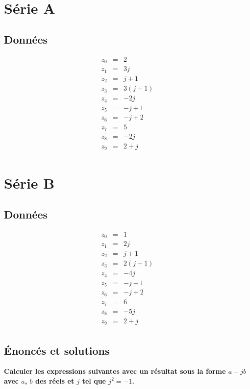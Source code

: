 \documentclass[11pt]{article}
\begin{document}
\begin{multicols}{2}

\section*{Série A}
    \subsection*{Données}
  \begin{eqnarray*}
    z_{0} & = & 2\\
    z_{1} & = & 3j\\
    z_{2} & = & j + 1\\
    z_{3} & = & 3(j+1)\\
    z_{4} & = & -2j\\
    z_{5} & = & -j + 1\\
    z_{6} & = & -j + 2\\
    z_{7} & = & 5\\
    z_{8} & = & -2j\\
    z_{9} & = & 2 + j\\
  \end{eqnarray*}

\section*{Série B}

  \subsection*{Données}

  \begin{eqnarray*}
    z_{0} & = & 1\\
    z_{1} & = & 2j\\
    z_{2} & = & j + 1\\
    z_{3} & = & 2(j+1)\\
    z_{4} & = & -4j\\
    z_{5} & = & -j - 1\\
    z_{6} & = & -j + 2\\
    z_{7} & = & 6\\
    z_{8} & = & -5j\\
    z_{9} & = & 2 + j\\
  \end{eqnarray*}
\end{multicols}

  \subsection*{Énoncés et solutions}
  \textbf{Calculer les expressions suivantes avec un résultat sous la forme $a + jb$ avec $a$, $b$ des réels et $j$ tel que $j^{2} = -1$.}
\end{document}
